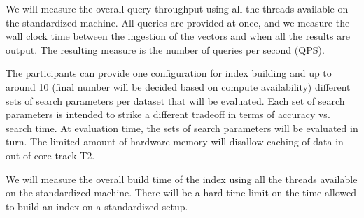 



 We will measure the overall query
throughput using all the threads available on the standardized machine.
All queries are provided at once, and we measure the wall clock time
between the ingestion of the vectors and when all the results are
output. The resulting measure is the number of queries per second (QPS).




The participants can provide one configuration for index building and
up to around 10 (final number will be decided based on compute
availability) different sets of search parameters per dataset that
will be evaluated.  Each set of search parameters is intended to
strike a different tradeoff in terms of accuracy vs. search time.  At
evaluation time, the sets of search parameters will be evaluated in
turn. The limited amount of hardware memory will disallow caching
of data in out-of-core track T2.



 We will measure the overall build time of
the index using all the threads available on the standardized machine. 
There will be a hard time limit on the time allowed to build an index on a standardized setup.


